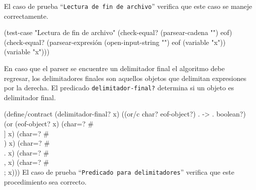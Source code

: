 \documentclass[10pt,oneside,openany,letterpaper]{book}
\begin{document}
El caso de prueba ``{\tt{}Lectura\ de\ fin\ de\ archivo}'' verifica que este caso se maneje correctamente.

\nwenddocs{}\plusendmoddef
(test-case "Lectura de fin de archivo"
  (check-equal? (parsear-cadena "") eof)
  (check-equal? (parsear-expresión (open-input-string "") eof (variable "x"))
                (variable "x")))
\nwendcode{}\nwdocspar

En caso que el parser se encuentre un delimitador final el algoritmo debe regresar, los delimitadores finales son aquellos objetos que delimitan expresiones por la derecha. El predicado {\tt{}\protect{}delimitador-final?} determina si un objeto es delimitador final.

\nwenddocs{}\endmoddef
(define/contract (delimitador-final? x)
  ((or/c char? eof-object?) . -> . boolean?)
  (or (eof-object? x) (char=? #\\] x) (char=? #\\) x)
      (char=? #\\. x)  (char=? #\\, x) (char=? #\\; x)))
\eatline
{}\nwendcode{}\nwdocspar
El caso de prueba ``{\tt{}Predicado\ para\ delimitadores}'' verifica que este procedimiento sea correcto.
\end{document}
